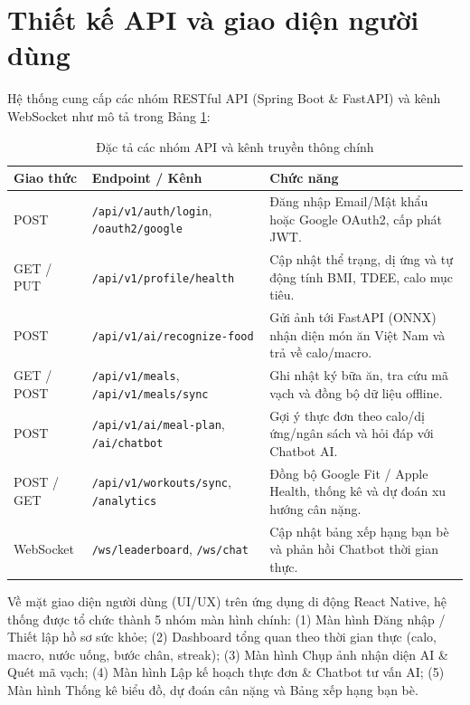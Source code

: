 \documentclass[../main.tex]{subfiles}
\begin{document}
\section{Thiết kế API và giao diện người dùng}
\label{sec:3.5}

Hệ thống cung cấp các nhóm RESTful API (Spring Boot \& FastAPI) và kênh WebSocket như mô tả trong Bảng \ref{tab:ch3_apis}:

\begin{table}[H]
    \centering
    \caption{Đặc tả các nhóm API và kênh truyền thông chính}
    \label{tab:ch3_apis}
    \begin{tabular}{|p{}|p{}|p{}|}
        \hline
        \rowcolor{primary!35}
        \textbf{Giao thức} & \textbf{Endpoint / Kênh} & \textbf{Chức năng} \\
        \hline
        POST & \texttt{/api/v1/auth/login}, \texttt{/oauth2/google} & Đăng nhập Email/Mật khẩu hoặc Google OAuth2, cấp phát JWT. \\
        \hline
        GET / PUT & \texttt{/api/v1/profile/health} & Cập nhật thể trạng, dị ứng và tự động tính BMI, TDEE, calo mục tiêu. \\
        \hline
        POST & \texttt{/api/v1/ai/recognize-food} & Gửi ảnh tới FastAPI (ONNX) nhận diện món ăn Việt Nam và trả về calo/macro. \\
        \hline
        GET / POST & \texttt{/api/v1/meals}, \texttt{/api/v1/meals/sync} & Ghi nhật ký bữa ăn, tra cứu mã vạch và đồng bộ dữ liệu offline. \\
        \hline
        POST & \texttt{/api/v1/ai/meal-plan}, \texttt{/ai/chatbot} & Gợi ý thực đơn theo calo/dị ứng/ngân sách và hỏi đáp với Chatbot AI. \\
        \hline
        POST / GET & \texttt{/api/v1/workouts/sync}, \texttt{/analytics} & Đồng bộ Google Fit / Apple Health, thống kê và dự đoán xu hướng cân nặng. \\
        \hline
        WebSocket & \texttt{/ws/leaderboard}, \texttt{/ws/chat} & Cập nhật bảng xếp hạng bạn bè và phản hồi Chatbot thời gian thực. \\
        \hline
    \end{tabular}
\end{table}

Về mặt giao diện người dùng (UI/UX) trên ứng dụng di động React Native, hệ thống được tổ chức thành 5 nhóm màn hình chính: (1) Màn hình Đăng nhập / Thiết lập hồ sơ sức khỏe; (2) Dashboard tổng quan theo thời gian thực (calo, macro, nước uống, bước chân, streak); (3) Màn hình Chụp ảnh nhận diện AI \& Quét mã vạch; (4) Màn hình Lập kế hoạch thực đơn \& Chatbot tư vấn AI; (5) Màn hình Thống kê biểu đồ, dự đoán cân nặng và Bảng xếp hạng bạn bè.
\end{document}
